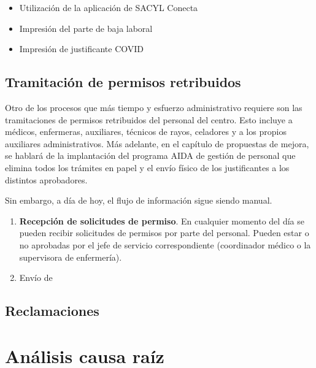 \begin{itemize}
    \item Utilización de la aplicación de SACYL Conecta
    \item Impresión del parte de baja laboral
    \item Impresión de justificante COVID
\end{itemize}

\subsection{Tramitación de permisos retribuidos}

Otro de los procesos que más tiempo y esfuerzo administrativo requiere son las tramitaciones de permisos retribuidos del personal del centro. Esto incluye a médicos, enfermeras, auxiliares, técnicos de rayos, celadores y a los propios auxiliares administrativos. Más adelante, en el capítulo de propuestas de mejora, se hablará de la implantación del programa AIDA de gestión de personal que elimina todos los trámites en papel y el envío físico de los justificantes a los distintos aprobadores.

Sin embargo, a día de hoy, el flujo de información sigue siendo manual.

\begin{enumerate}
    \item \textbf{Recepción de solicitudes de permiso}. En cualquier momento del día se pueden recibir solicitudes de permisos por parte del personal. Pueden estar o no aprobadas por el jefe de servicio correspondiente (coordinador médico o la supervisora de enfermería). 
    \item Envío de 
\end{enumerate}

\subsection{Reclamaciones}

\section{Análisis causa raíz}